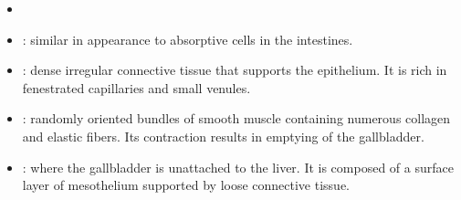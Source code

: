 \begin{itemize}
\begin{multicols}{2}
\begin{itemize}
    \begin{center}
    \end{center}
    
    \item {}
    
    \begin{center}
    \end{center}
    
    \item {}: similar in appearance to absorptive cells in the intestines.
    
    \begin{center}
    \end{center}
    
    \item {}: dense irregular connective tissue that supports the epithelium. It is rich in fenestrated capillaries and small venules.
    
    \begin{center}
    \end{center}
    
    \item {}: randomly oriented bundles of smooth muscle containing numerous collagen and elastic fibers. Its contraction results in emptying of the gallbladder.
    
    \begin{center}
    \end{center}
    
    \item {}: where the gallbladder is unattached to the liver. It is composed of a surface layer of mesothelium supported by loose connective tissue.
    
    \begin{center}
    \end{center}
    
    
  \end{itemize}
  \end{multicols}
  

\end{itemize}
